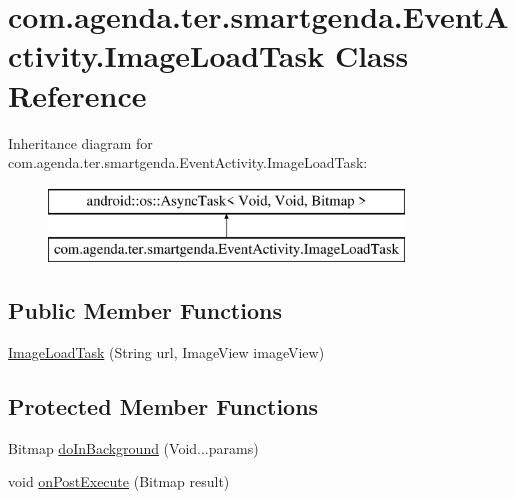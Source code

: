 \hypertarget{classcom_1_1agenda_1_1ter_1_1smartgenda_1_1_event_activity_1_1_image_load_task}{\section{com.\-agenda.\-ter.\-smartgenda.\-Event\-Activity.\-Image\-Load\-Task Class Reference}
\label{classcom_1_1agenda_1_1ter_1_1smartgenda_1_1_event_activity_1_1_image_load_task}
}
Inheritance diagram for com.\-agenda.\-ter.\-smartgenda.\-Event\-Activity.\-Image\-Load\-Task\-:\begin{figure}[H]
\begin{center}
\leavevmode
\includegraphics[height=2.000000cm]{classcom_1_1agenda_1_1ter_1_1smartgenda_1_1_event_activity_1_1_image_load_task}
\end{center}
\end{figure}
\subsection*{Public Member Functions}
\begin{DoxyCompactItemize}
\item 
\hyperlink{classcom_1_1agenda_1_1ter_1_1smartgenda_1_1_event_activity_1_1_image_load_task_a60896fc35220743572ea6bda1aba484f}{Image\-Load\-Task} (String url, Image\-View image\-View)
\end{DoxyCompactItemize}
\subsection*{Protected Member Functions}
\begin{DoxyCompactItemize}
\item 
Bitmap \hyperlink{classcom_1_1agenda_1_1ter_1_1smartgenda_1_1_event_activity_1_1_image_load_task_ae101323638b5f3622af104aef2bab037}{do\-In\-Background} (Void...\-params)
\item 
void \hyperlink{classcom_1_1agenda_1_1ter_1_1smartgenda_1_1_event_activity_1_1_image_load_task_a8c37d5ee7cedf031b3512e57720105c0}{on\-Post\-Execute} (Bitmap result)
\end{DoxyCompactItemize}


